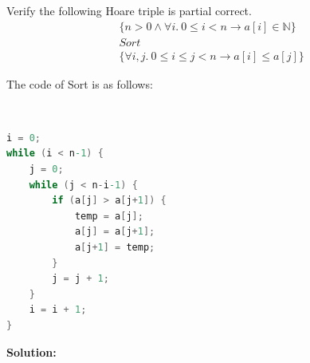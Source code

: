 \documentclass{article}
\begin{document}
\maketitle
Verify the following Hoare triple is partial correct.
\begin{align*}
    &\{n > 0 \land \forall i. \ 0 \leq i < n \to a[i] \in \mathbb{N} \} \\
    &Sort \\
    &\{ \forall i, j. \ 0 \leq i \leq j < n \to a[i] \leq a[j] \}
\end{align*}

The code of Sort is as follows:

~\\
\begin{lstlisting}[language=C,xleftmargin=6em,xrightmargin=22em]
i = 0;
while (i < n-1) {
    j = 0;
    while (j < n-i-1) {
        if (a[j] > a[j+1]) {
            temp = a[j];
            a[j] = a[j+1];
            a[j+1] = temp;
        }
        j = j + 1;
    }
    i = i + 1;
}
\end{lstlisting}

\newpage
\textbf{Solution:}
\end{document}
